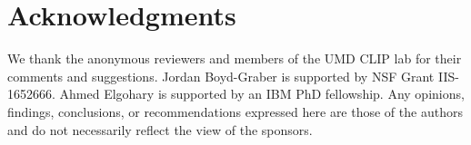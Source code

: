 \section*{Acknowledgments}
We thank the anonymous reviewers and  members of the UMD CLIP
lab for their comments and suggestions. Jordan Boyd-Graber is
supported by NSF Grant IIS-1652666. 
Ahmed Elgohary is supported by an IBM PhD fellowship. 
Any opinions, findings, conclusions,
or recommendations expressed here are those of the authors and do not 
necessarily reflect the view of the sponsors.
